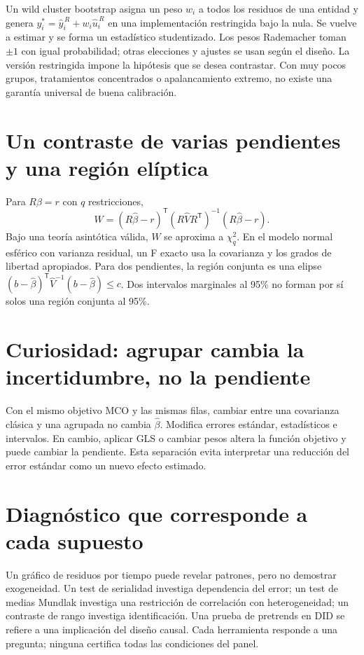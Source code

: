 \documentclass[11pt,a4paper]{article}
\newcommand{\T}{^{\mathsf T}}
\theoremstyle{definition}
\begin{document}
Un wild cluster bootstrap asigna un peso $w_i$ a todos los residuos de una entidad y genera
$y_i^*=\widehat y_i^{\,R}+w_i\widehat u_i^{\,R}$ en una implementación restringida bajo la nula.
Se vuelve a estimar y se forma un estadístico studentizado. Los pesos Rademacher toman $\pm1$ con igual probabilidad; otras elecciones y ajustes se usan según el diseño.
La versión restringida impone la hipótesis que se desea contrastar.
Con muy pocos grupos, tratamientos concentrados o apalancamiento extremo, no existe una garantía universal de buena calibración.

\section{Un contraste de varias pendientes y una región elíptica}
Para $R\beta=r$ con $q$ restricciones,
\[
W=(R\widehat\beta-r)\T
(R\widehat V R\T)^{-1}(R\widehat\beta-r).
\]
Bajo una teoría asintótica válida, $W$ se aproxima a $\chi_q^2$.
En el modelo normal esférico con varianza residual, un F exacto usa la covarianza y los grados de libertad apropiados.
Para dos pendientes, la región conjunta es una elipse
$(b-\widehat\beta)\T\widehat V^{-1}(b-\widehat\beta)\le c$.
Dos intervalos marginales al 95\% no forman por sí solos una región conjunta al 95\%.

\section{Curiosidad: agrupar cambia la incertidumbre, no la pendiente}
Con el mismo objetivo MCO y las mismas filas, cambiar entre una covarianza clásica y una agrupada no cambia $\widehat\beta$.
Modifica errores estándar, estadísticos e intervalos. En cambio, aplicar GLS o cambiar pesos altera la función objetivo y puede cambiar la pendiente.
Esta separación evita interpretar una reducción del error estándar como un nuevo efecto estimado.

\section{Diagnóstico que corresponde a cada supuesto}
Un gráfico de residuos por tiempo puede revelar patrones, pero no demostrar exogeneidad.
Un test de serialidad investiga dependencia del error; un test de medias Mundlak investiga una restricción de correlación con heterogeneidad; un contraste de rango investiga identificación.
Una prueba de pretrends en DID se refiere a una implicación del diseño causal.
Cada herramienta responde a una pregunta; ninguna certifica todas las condiciones del panel.
\end{document}
